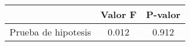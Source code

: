\begin{tabular}{l*{1}{cc}} \hline\hline
                    &     Valor F&     P-valor\\
\hline
Prueba de hipotesis &       0.012&       0.912\\
\hline\hline
\end{tabular}
